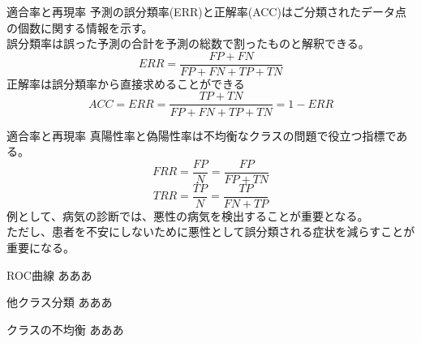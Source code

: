 \documentclass[aspectratio=169, dvipdfmx, 11pt]{beamer} %
\begin{document}
\begin{frame}{適合率と再現率}
    予測の誤分類率(ERR)と正解率(ACC)はご分類されたデータ点の個数に関する情報を示す。\\
    誤分類率は誤った予測の合計を予測の総数で割ったものと解釈できる。
    \begin{equation*}
        ERR = \frac{FP+FN}{FP+FN+TP+TN}
    \end{equation*}
    正解率は誤分類率から直接求めることができる
    \begin{equation*}
        ACC = ERR = \frac{TP+TN}{FP+FN+TP+TN} = 1 - ERR
    \end{equation*}
\end{frame}

\begin{frame}{適合率と再現率}
    真陽性率と偽陽性率は不均衡なクラスの問題で役立つ指標である。
    \begin{equation*}
        FRR = \frac{FP}{N} = \frac{FP}{FP+TN}
    \end{equation*}
    \begin{equation*}
        TRR = \frac{TP}{N} = \frac{TP}{FN+TP}
    \end{equation*}
    例として、病気の診断では、悪性の病気を検出することが重要となる。\\
    ただし、患者を不安にしないために悪性として誤分類される症状を減らすことが重要になる。
\end{frame}

\begin{frame}{ROC曲線}
    あああ
\end{frame}

\begin{frame}{他クラス分類}
    あああ
\end{frame}

\begin{frame}{クラスの不均衡}
    あああ
\end{frame}
\end{document}
